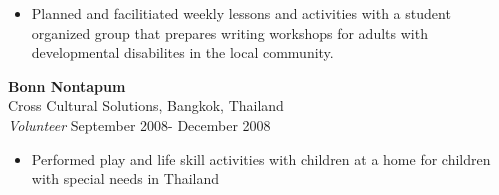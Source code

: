 \documentclass[line,margin,10pt]{res}
\begin{document}
\begin{resume}
                 \begin{itemize}  \itemsep -2pt %
                 \item Planned and facilitiated weekly lessons and activities with a student organized group that prepares writing workshops for adults with developmental disabilites in the local community.
                 \end{itemize} 
                 
                       \textbf{Bonn Nontapum }\\
                 Cross Cultural Solutions, Bangkok, Thailand\\
                {\sl Volunteer} \hfill        September 2008- December 2008
                
                  \begin{itemize}
									\item Performed play and life skill activities with children at a home for children with special needs in Thailand
                   \end{itemize} 
 

\end{resume}
\end{document}
